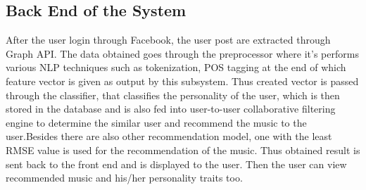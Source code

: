 \subsection{Back End of the System}
After the user login through Facebook, the user post are extracted through Graph API. The data obtained goes through the preprocessor where it's performs various NLP techniques such as tokenization, POS tagging at the end of which feature vector is given as output by this subsystem. Thus created vector is passed through the classifier, that classifies the personality of the user, which is then stored in the database and is also fed into user-to-user collaborative filtering engine to determine the similar user and recommend the music to the user.Besides there are also other recommendation model, one with the least RMSE value is used for the recommendation of the music. Thus obtained result is sent back to the front end and is displayed to the user. Then the user can view recommended music and his/her personality traits too.
